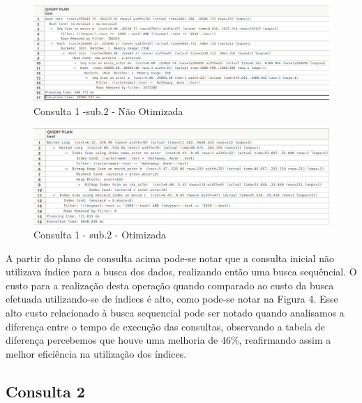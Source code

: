 \documentclass[
	12pt,				%
	oneside,			%
	a4paper,			%
	brazil				%
	]{abntex2}
\begin{document}
\begin{landscape}
\begin{figure}
\centering
\includegraphics[scale = 0.7]{Consulta1_naootimizada_sub2.png}
\caption{Consulta 1 -sub.2 - Não Otimizada}
\end{figure}
\begin{figure}
\centering
\includegraphics[scale = 0.7]{Consuta1_opt_sub2__1_.png}
\caption{Consulta 1 - sub.2 - Otimizada}
\end{figure}
\end{landscape}

\newpage

\indent A partir do plano de consulta acima pode-se notar que a consulta inicial não utilizava índice para a busca dos dados, realizando então uma busca sequêncial. O custo para a realização desta operação quando comparado ao custo da busca efetuada utilizando-se de índices é alto, como pode-se notar na Figura 4. Esse alto custo relacionado à busca sequencial pode ser notado quando analisamos a diferença entre o tempo de execução das consultas, observando a tabela de diferença percebemos que houve uma melhoria de 46\%, reafirmando assim a melhor eficiência na utilização dos índices. 

\subsection{Consulta 2}
\end{document}
